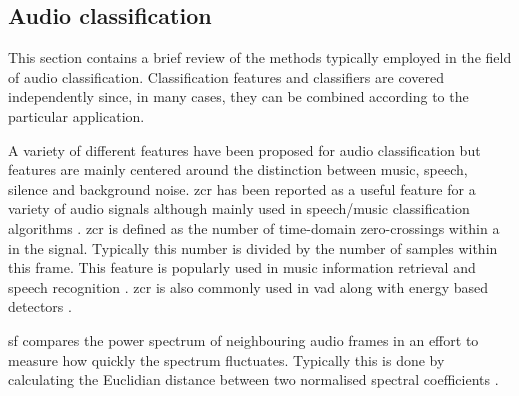 %

\subsection{Audio classification}
This section contains a brief review of the methods typically employed in the field of audio classification. Classification features and classifiers are covered independently since, in many cases, they can be combined according to the particular application.

A variety of different features have been proposed for audio classification but features are mainly centered around the distinction between music, speech, silence and background noise. \DIFdelbegin {}\DIFdelend \DIFaddbegin \gls{zcr} \DIFaddend has been reported as a useful feature for a variety of audio signals although mainly used in speech/music classification algorithms \cite{Lu2002}. \DIFdelbegin {}\DIFdelend \DIFaddbegin \gls{zcr} \DIFaddend is defined as the number of time-domain zero-crossings within a \DIFdelbegin {}\DIFdelend \DIFaddbegin {}\DIFaddend in the signal. Typically this number is divided by the number of samples within this frame. This feature is popularly used in music information retrieval and speech recognition \cite{Saraceno1997}\cite{Scheirer1997}\cite{Gouyon2000}. \DIFdelbegin {}\DIFdelend \DIFaddbegin \gls{zcr} \DIFaddend is also commonly used in \DIFdelbegin {}\DIFdelend \DIFaddbegin \gls{vad} \DIFaddend along with energy based detectors \cite{Sangwan2002}.

\DIFdelbegin {}\DIFdelend \DIFaddbegin \gls{sf} \DIFaddend compares the power spectrum of neighbouring audio frames in an effort to measure how quickly the spectrum fluctuates. Typically this is done by calculating the Euclidian distance between two normalised spectral coefficients \cite{Wang2012}.


